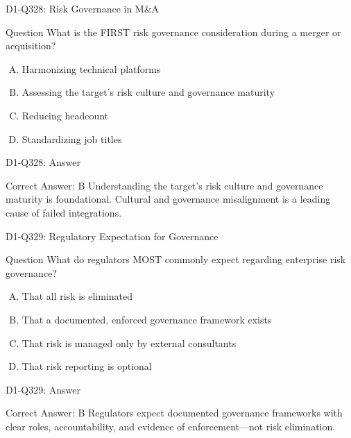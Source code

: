 \documentclass{beamer}
\begin{document}
\begin{frame}{D1-Q328: Risk Governance in M\&A}
	\begin{block}{Question}
		What is the FIRST risk governance consideration during a merger or acquisition?
	\end{block}
	\begin{enumerate}[(A)]
		\item Harmonizing technical platforms
		\item Assessing the target's risk culture and governance maturity
		\item Reducing headcount
		\item Standardizing job titles
	\end{enumerate}
\end{frame}
\begin{frame}{D1-Q328: Answer}
	\begin{block}{Correct Answer: B}
		Understanding the target's risk culture and governance maturity is foundational. Cultural and governance misalignment is a leading cause of failed integrations.
	\end{block}
\end{frame}

\begin{frame}{D1-Q329: Regulatory Expectation for Governance}
	\begin{block}{Question}
		What do regulators MOST commonly expect regarding enterprise risk governance?
	\end{block}
	\begin{enumerate}[(A)]
		\item That all risk is eliminated
		\item That a documented, enforced governance framework exists
		\item That risk is managed only by external consultants
		\item That risk reporting is optional
	\end{enumerate}
\end{frame}
\begin{frame}{D1-Q329: Answer}
	\begin{block}{Correct Answer: B}
		Regulators expect documented governance frameworks with clear roles, accountability, and evidence of enforcement—not risk elimination.
	\end{block}
\end{frame}
\end{document}
